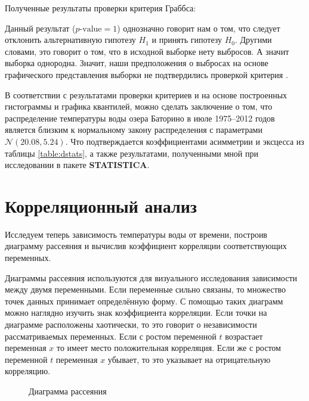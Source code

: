 Полученные результаты проверки критерия Граббса:

Данный результат ($p\textrm{-value} = 1$) однозначно говорит нам о том, что следует отклонить альтернативную гипотезу $H_{1}$ и принять гипотезу $H_{0}$. Другими словами, это говорит о том, что в исходной выборке нету выбросов. А значит выборка однородна. Значит, наши предположения о выбросах на основе графического представления выборки не подтвердились проверкой критерия \cite{Grubbs1950Sample}.

В соответствии с результатами проверки критериев и на основе построенных гистограммы и графика квантилей, можно сделать заключение о том, что распределение температуры воды озера Баторино в июле 1975--2012 годов является близким к нормальному закону распределения с параметрами $\mathcal{N}(20.08, 5.24)$. Что подтверждается коэффициентами асимметрии и эксцесса из таблицы \ref{table:dstats}, а также результатами, полученными мной при исследовании в пакете \textbf{STATISTICA}.


\section{Корреляционный анализ} %
\label{sec:corr_analysis}

Исследуем теперь зависимость температуры воды от времени, построив диаграмму рассеяния и вычислив коэффициент корреляции соответствующих переменных.

Диаграммы рассеяния используются для визуального исследования зависимости между двумя переменными. Если переменные сильно связаны, то множество точек данных принимает определённую форму. С помощью таких диаграмм можно наглядно изучить знак коэффициента корреляции. Если точки на диаграмме расположены хаотически, то это говорит о независимости рассматриваемых переменных. Если с ростом переменной $t$ возрастает переменная $x$ то имеет место положительная корреляция. Если же с ростом переменной $t$ переменная $x$ убывает, то это указывает на отрицательную корреляцию. 
\begin{figure}[ht]
\caption{Диаграмма рассеяния}
\label{img:scatterplot}
\end{figure}

